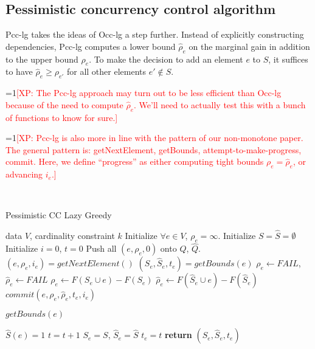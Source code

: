 \documentclass{article}
\newcommand{\Comments}{1}
\newcommand{\note}[2]{\ifnum\Comments=1\textcolor{#1}{#2}\fi}
\newcommand{\xinghao}[1]{\note{red}{[XP: #1]}}
\newcommand{\occlz}{Occ-lg}
\newcommand{\pcclz}{Pcc-lg}
\begin{document}
\subsection{Pessimistic concurrency control algorithm}
\pcclz{} takes the ideas of \occlz{} a step further.
Instead of explicitly constructing dependencies, \pcclz{} computes a lower bound $\widehat\rho_e$ on the marginal gain in addition to the upper bound $\rho_e$.
To make the decision to add an element $e$ to $S$, it suffices to have $\widehat\rho_e \geq \rho_{e'}$ for all other elements $e' \not\in S$.

\xinghao{The \pcclz{} approach may turn out to be less efficient than \occlz{} because of the need to compute $\widehat\rho_e$.
We'll need to actually test this with a bunch of functions to know for sure.}

\xinghao{\pcclz{} is also more in line with the pattern of our non-monotone paper.
The general pattern is: getNextElement, getBounds, attempt-to-make-progress, commit.
Here, we define ``progress'' as either computing tight bounds $\rho_e = \widehat\rho_e$, or advancing $i_e$.}

~

\begin{algorithm}[tb]
  \caption{Pessimistic CC Lazy Greedy}
  \label{alg:cclz}
\begin{algorithmic}[1]
   data $V$, cardinality constraint $k$
  \STATE Initialize $\forall e \in V$, $\rho_e = \infty$.
  \STATE Initialize $S = \widehat{S} = \emptyset$
  \STATE Initialize $i = 0$, $t = 0$
  \STATE Push all $(e, \rho_e, 0)$ onto $Q$, $\widehat{Q}$.
    \STATE $(e, \rho_e, i_e) = getNextElement()$
    \STATE $(S_e, \widehat{S}_e, t_e) = getBounds(e)$
      \STATE $\rho_e \leftarrow FAIL$, $\widehat\rho_e \leftarrow FAIL$
    \ELSE
      \STATE $\rho_e     \leftarrow F(S_e\cup e) - F(S_e)$
      \STATE $\widehat\rho_e \leftarrow F(\widehat{S}_e\cup e) - F(\widehat{S}_e)$
    \ENDIF
    \STATE $commit(e, \rho_e, \widehat\rho_e, t_e, i_e)$
  \ENDFOR
\end{algorithmic}
\end{algorithm}



\begin{algorithm}[tb]
  \caption{$getBounds(e)$}
  \label{alg:cclz:getbound}
\begin{algorithmic}
  \STATE $\widehat{S}(e) = 1$
  \STATE $t = t + 1$
  \STATE $S_e = S$, $\widehat{S}_e = \widehat{S}$
  \STATE $t_e = t$
  \STATE \textbf{return} $(S_e, \widehat{S}_e, t_e)$
\end{algorithmic}
\end{algorithm}
\end{document}
